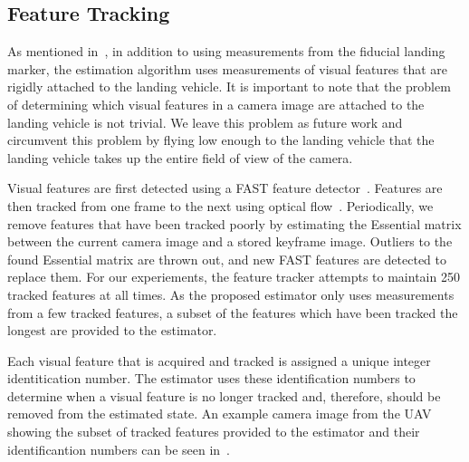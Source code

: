 
\subsection{Feature Tracking}
As mentioned in~, in addition to using measurements from the fiducial landing
marker, the estimation algorithm uses measurements of visual features that are
rigidly attached to the landing vehicle. It is important to note that the
problem of determining which visual features in a camera image are attached to
the landing vehicle is not trivial. We leave this problem as future work and
circumvent this problem by flying low enough to the landing vehicle that the
landing vehicle takes up the entire field of view of the camera.

Visual features are first detected using a FAST feature
detector~\cite{rosten2006machine}. Features are then tracked from one frame to
the next using optical flow~\cite{bouguet2001pyramidal}. Periodically, we remove
features that have been tracked poorly by estimating the Essential matrix between
the current camera image and a stored keyframe image. Outliers to the found
Essential matrix are thrown out, and new FAST features are detected to replace
them. For our experiements, the feature tracker attempts to maintain 250
tracked features at all times. As the proposed estimator only uses measurements from a few
tracked features, a subset of the features which have been tracked the longest
are provided to the estimator. 

Each visual feature that is acquired and tracked is assigned a unique integer
identitication number. The estimator uses these identification numbers to
determine when a visual feature is no longer tracked and, therefore, should be removed from
the estimated state.
An example camera image from the UAV showing the
subset of tracked features provided to the estimator and their identificantion
numbers can be seen in~.


